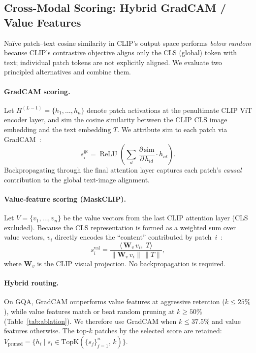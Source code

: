 \documentclass[10pt,twocolumn,letterpaper]{article}
\begin{document}
\subsection{Cross-Modal Scoring: Hybrid GradCAM / Value Features}

Naïve patch--text cosine similarity in CLIP's output space performs
\emph{below random} because CLIP's contrastive objective aligns only the
CLS (global) token with text; individual patch tokens are not explicitly
aligned.  We evaluate two principled alternatives and combine them.

\paragraph{GradCAM scoring.}
Let $H^{(L-1)} = \{h_1,\ldots,h_n\}$ denote patch activations at the
penultimate CLIP ViT encoder layer, and $\text{sim}$ the cosine similarity
between the CLIP CLS image embedding and the text embedding $T$.
We attribute $\text{sim}$ to each patch via GradCAM~\cite{selvaraju2017gradcam}:
\begin{equation}
  s^{\text{gc}}_i = \operatorname{ReLU}\!\left(
        \sum_{d}\, \frac{\partial\,\text{sim}}{\partial\, h_{id}}\cdot h_{id}
        \right).
  \label{eq:gradcam}
\end{equation}
Backpropagating through the final attention layer captures each patch's
\emph{causal} contribution to the global text-image alignment.

\paragraph{Value-feature scoring (MaskCLIP).}
Let $V = \{v_1,\ldots,v_n\}$ be the value vectors from the last CLIP
attention layer (CLS excluded).  Because the CLS representation is formed
as a weighted sum over value vectors, $v_i$ directly encodes the
``content'' contributed by patch~$i$~\cite{zhou2022maskclip}:
\begin{equation}
  s^{\text{val}}_i =
  \frac{\langle\, \mathbf{W}_v\,v_i,\; T \rangle}
       {\|\mathbf{W}_v\,v_i\|\,\|T\|},
  \label{eq:value}
\end{equation}
where $\mathbf{W}_v$ is the CLIP visual projection.
No backpropagation is required.

\paragraph{Hybrid routing.}
On GQA, GradCAM outperforms value features at aggressive retention
($k \leq 25\%$), while value features match or beat random pruning at
$k \geq 50\%$ (Table~\ref{tab:ablation}).
We therefore use GradCAM when $k \leq 37.5\%$ and value features otherwise.
The top-$k$ patches by the selected score are retained:
$V_{\text{pruned}} = \{h_i \mid s_i \in \text{TopK}(\{s_j\}_{j=1}^{n},\, k)\}$.
\end{document}
